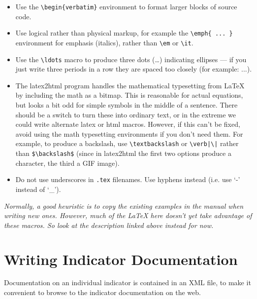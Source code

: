 \begin{itemize}

\item Use the \verb|\begin{verbatim}| environment to format larger blocks of
source code.

\item Use logical rather than physical markup, for example the
\verb|\emph{ ... }| environment for emphasis (italics), rather than
\verb|\em| or \verb|\it|.

\item Use the \verb|\ldots| macro to produce three dots (\ldots) indicating
  ellipses --- if you just write three periods in a row they are spaced too
  closely (for example: ...).

\item The latex2html  program handles the mathematical typesetting from
  \LaTeX{} by including the math as a bitmap.  This is reasonable for
  actual equations, but looks a bit odd for simple symbols in the middle of
  a sentence.  There should be a switch to turn these into ordinary text,
  or in the extreme we could write alternate latex or html macros.
  However, if this can't be fixed, avoid using the math typesetting
  environments if you don't need them.  For example, to produce a
  backslash, use \verb|\textbackslash| or \verb$\verb|\|$ rather than
  \verb|$\backslash$| (since in latex2html  the first two options produce a
  character, the third a GIF image).

\item Do not use underscores in \verb|.tex| filenames. Use hyphens instead (i.e. use `-' instead of `_').

\end{itemize}


\emph{Normally, a good heuristic is to copy the existing examples in the
  manual when writing new ones.  However, much of the \LaTeX{} here doesn't yet
  take advantage of these macros.  So look at the description linked above
  instead for now.}

\section{Writing Indicator Documentation}
\label{sec:writing-indicators}

Documentation on an individual indicator is contained in an XML file, to
make it convenient to browse to the indicator documentation on the web.

